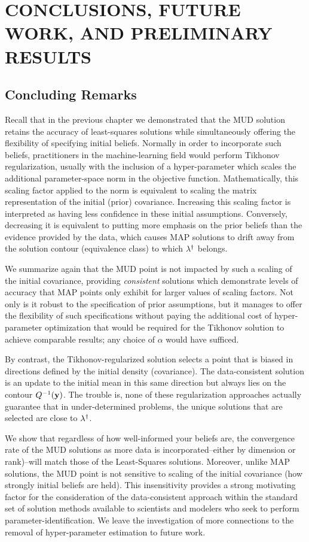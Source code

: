 \chapter{\uppercase{Conclusions, Future Work, and Preliminary Results} \label{chapter:future}}


\section{Concluding Remarks}
Recall that in the previous chapter we demonstrated that the MUD solution retains the accuracy of least-squares solutions while simultaneously offering the flexibility of specifying initial beliefs.
Normally in order to incorporate such beliefs, practitioners in the machine-learning field would perform Tikhonov regularization, usually with the inclusion of a hyper-parameter which scales the additional parameter-space norm in the objective function.
Mathematically, this scaling factor applied to the norm is equivalent to scaling the matrix representation of the initial (prior) covariance.
Increasing this scaling factor is interpreted as having less confidence in these initial assumptions.
Conversely, decreasing it is equivalent to putting more emphasis on the prior beliefs than the evidence provided by the data, which causes MAP solutions to drift away from the solution contour (equivalence class) to which $\lambda^\dagger$ belongs.

We summarize again that the MUD point is not impacted by such a scaling of the initial covariance, providing \emph{consistent} solutions which demonstrate levels of accuracy that MAP points only exhibit for larger values of scaling factors.
Not only is it robust to the specification of prior assumptions, but it manages to offer the flexibility of such specifications without paying the additional cost of hyper-parameter optimization that would be required for the Tikhonov solution to achieve comparable results; any choice of $\alpha$ would have sufficed.

By contrast, the Tikhonov-regularized solution selects a point that is biased in directions defined by the initial density (covariance).
The data-consistent solution is an update to the initial mean in this same direction but always lies on the contour $Q^{-1}(\mathbf{y})$.
The trouble is, none of these regularization approaches actually guarantee that in under-determined problems, the unique solutions that are selected are close to $\lambda^\dagger$.

We show that regardless of how well-informed your beliefs are, the convergence rate of the MUD solutions as more data is incorporated\---either by dimension or rank)\---will match those of the Least-Squares solutions.
Moreover, unlike MAP solutions, the MUD point is not sensitive to scaling of the initial covariance (how strongly initial beliefs are held).
This insensitivity provides a strong motivating factor for the consideration of the data-consistent approach within the standard set of solution methods available to scientists and modelers who seek to perform parameter-identification.
We leave the investigation of more connections to the removal of hyper-parameter estimation to future work.

